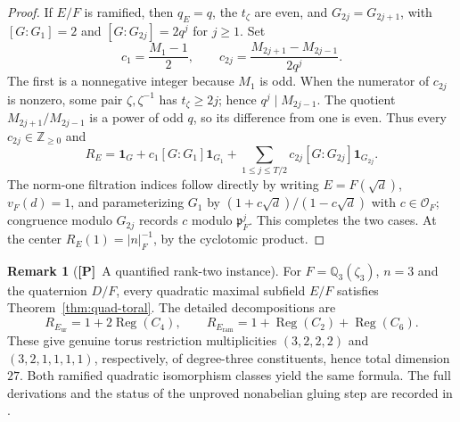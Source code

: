 \documentclass[11pt]{article}
\newcommand{\Ptag}{\textnormal{\textbf{[P]}}}
\theoremstyle{plain}
\theoremstyle{definition}
\newtheorem{remark}[theorem]{Remark}
\begin{document}
\begin{proof}
If $E/F$ is ramified, then $q_E=q$, the $t_\zeta$ are even,
and $G_{2j}=G_{2j+1}$, with
$[G:G_1]=2$ and $[G:G_{2j}]=2q^j$ for $j\ge1$.
Set
\[
c_1=\frac{M_1-1}{2},\qquad
c_{2j}=\frac{M_{2j+1}-M_{2j-1}}{2q^j}.
\]
The first is a nonnegative integer because $M_1$ is odd.
When the numerator of $c_{2j}$ is nonzero, some pair
$\zeta,\zeta^{-1}$ has $t_\zeta\ge2j$; hence
$q^j\mid M_{2j-1}$.  The quotient
$M_{2j+1}/M_{2j-1}$ is a power of odd $q$, so its difference
from one is even.  Thus every $c_{2j}\in\mathbb Z_{\ge0}$ and
\[
R_E=\mathbf1_G+c_1[G:G_1]\mathbf1_{G_1}
+\sum_{1\le j\le T/2}c_{2j}[G:G_{2j}]\mathbf1_{G_{2j}}.
\]
The norm-one filtration indices follow directly by writing
$E=F(\sqrt d)$, $v_F(d)=1$, and parameterizing
$G_1$ by $(1+c\sqrt d)/(1-c\sqrt d)$ with $c\in\mathcal O_F$;
congruence modulo $G_{2j}$ records $c$ modulo
$\mathfrak p_F^j$.  This completes the two cases.
At the center $R_E(1)=|n|_F^{-1}$, by the cyclotomic product.
\end{proof}

\begin{remark}[\Ptag\ A quantified rank-two instance]\label{prop:all-three-tori}
For $F=\mathbb Q_3(\zeta_3)$, $n=3$ and the quaternion
$D/F$, every quadratic maximal subfield $E/F$ satisfies
Theorem~\ref{thm:quad-toral}.  The detailed decompositions are
\[
R_{E_{\mathrm{ur}}}=1+2\operatorname{Reg}(C_4),\qquad
R_{E_{\mathrm{ram}}}
=1+\operatorname{Reg}(C_2)+\operatorname{Reg}(C_6).
\]
These give genuine torus restriction multiplicities
$(3,2,2,2)$ and $(3,2,1,1,1,1)$, respectively, of
degree-three constituents, hence total dimension $27$.
Both ramified quadratic isomorphism classes yield the same
formula.  The full derivations and the status of the unproved
nonabelian gluing step are recorded in \cite{RankTwo0}.
\end{remark}
\end{document}
